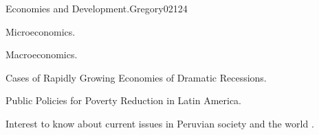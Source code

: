 \begin{syllabus}
\begin{unit}{Economies and Development.}{}{Gregory02}{12}{4}
   \begin{topics}
      \item Microeconomics.
      \item Macroeconomics.
      \item Cases of Rapidly Growing Economies of Dramatic Recessions.
      \item Public Policies for Poverty Reduction in Latin America.
   \end{topics}
   \begin{learningoutcomes}
      \item Interest to know about current issues in Peruvian society and the world .
   \end{learningoutcomes}
\end{unit}

\begin{coursebibliography}
\end{coursebibliography}

\end{syllabus}
